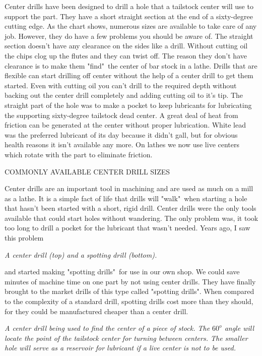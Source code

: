 Center drills have been designed to drill a hole that a tailstock center will
use to support the part. They have a short straight section at the end of a
sixty-degree cutting edge. As the chart shows, numerous sizes are available to
take care of any job. However, they do have a few problems you should be aware
of. The straight section doesn't have any clearance on the sides like a drill.
Without cutting oil the chips clog up the flutes and they can twist off. The
reason they don't have clearance is to make them "find"\ the center of bar stock
in a lathe. Drills that are flexible can start drilling off center without the
help of a center drill to get them started. Even with cutting oil you can't
drill to the required depth without backing out the center drill completely and
adding cutting oil to it's tip. The straight part of the hole was to make a
pocket to keep lubricants for lubricating the supporting sixty-degree tailstock
dead center. A great deal of heat from friction can be generated at the center
without proper lubrication. White lead was the preferred lubricant of its day
because it didn't gall, but for obvious health reasons it isn't available any
more. On lathes we now use live centers which rotate with the part to eliminate
friction.

\bigskip
\textsc{COMMONLY AVAILABLE CENTER DRILL SIZES}
\bigskip


Center drills are an important tool in machining and are used as much on a mill
as a lathe. It is a simple fact of life that drills will "walk"\ when starting a
hole that hasn't been started with a short, rigid drill. Center drills were the
only tools available that could start holes without wandering. The only problem
was, it took too long to drill a pocket for the lubricant that wasn't needed.
Years ago, I saw this problem

\bigskip
\textit{A center drill (top) and a spotting drill (bottom).}
\bigskip

and started making "spotting drills"\ for use in our own shop. We could save
minutes of machine time on one part by not using center drills. They have
finally brought to the market drills of this type called "spotting drills". When
compared to the complexity of a standard drill, spotting drills cost more than
they should, for they could be manufactured cheaper than a center drill.

\bigskip
\textit{A center drill being used to find the center of a piece of stock. The
$60^{o}$ angle will locate the point of the tailstock center for turning between
centers. The smaller hole will serve as a reservoir for lubricant if a live
center is not to be used.}
\bigskip

